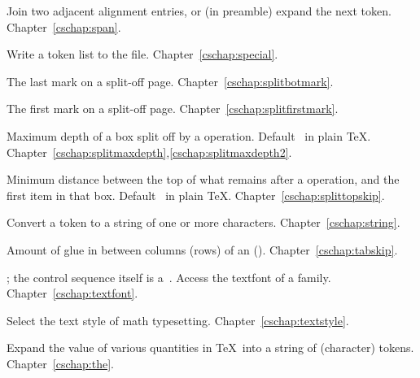 \begin{glossinventory}
\item [\cs{span}]
      Join two adjacent alignment entries, or (in preamble)
      expand the next token.
Chapter~\ref{cschap:span}.

\item [\cs{special\gr{general text}}]
      Write a token list  to the  file.
Chapter~\ref{cschap:special}.

\item [\cs{splitbotmark}]
      The last mark on a split-off page.
Chapter~\ref{cschap:splitbotmark}.

\item [\cs{splitfirstmark}]
      The first mark on a split-off page.
Chapter~\ref{cschap:splitfirstmark}.

\item [\cs{splitmaxdepth}]
      Maximum depth of a box split off by a  operation. 
      Default~\n{4pt} in plain \TeX.
Chapter~\ref{cschap:splitmaxdepth},\ref{cschap:splitmaxdepth2}.

\item [\cs{splittopskip}]
      Minimum distance between the top of what remains after a
       operation, and the first item in that box.
      Default~\n{10pt} in plain \TeX.
Chapter~\ref{cschap:splittopskip}.

\item [\cs{string\gr{token}}]
      Convert a token to a string of one or more characters. 
Chapter~\ref{cschap:string}.

\item [\cs{tabskip}]
      Amount of glue in between columns (rows) of an 
 \alt
      ().
Chapter~\ref{cschap:tabskip}.

\item [\cs{textfont\gr{4-bit number}}]
      ; the control sequence itself
      is a~.
      Access the textfont of a family.
Chapter~\ref{cschap:textfont}.

\item [\cs{textstyle}]
      Select the text style of math typesetting.
Chapter~\ref{cschap:textstyle}.

\item [\cs{the\gr{internal quantity}}]
      Expand the value of various quantities in \TeX\ into a string
      of (character) tokens.
Chapter~\ref{cschap:the}.


\end{glossinventory}
